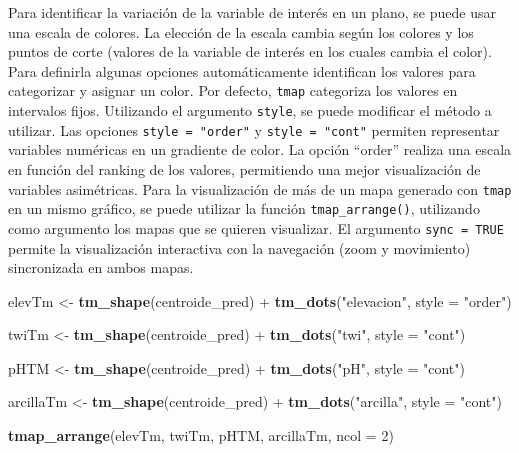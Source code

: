 \documentclass[11pt,b5paper,]{krantz}
\newenvironment{Shaded}{}{}
\newcommand{\KeywordTok}[1]{\textcolor[rgb]{0.00,0.44,0.13}{\textbf{#1}}}
\newcommand{\DataTypeTok}[1]{\textcolor[rgb]{0.56,0.13,0.00}{#1}}
\newcommand{\DecValTok}[1]{\textcolor[rgb]{0.25,0.63,0.44}{#1}}
\newcommand{\StringTok}[1]{\textcolor[rgb]{0.25,0.44,0.63}{#1}}
\newcommand{\OperatorTok}[1]{\textcolor[rgb]{0.40,0.40,0.40}{#1}}
\newcommand{\NormalTok}[1]{#1}
\begin{document}
Para identificar la variación de la variable de interés en un plano, se
puede usar una escala de colores. La elección de la escala cambia según
los colores y los puntos de corte (valores de la variable de interés en
los cuales cambia el color). Para definirla algunas opciones
automáticamente identifican los valores para categorizar y asignar un
color. Por defecto, \texttt{tmap} categoriza los valores en intervalos
fijos. Utilizando el argumento \texttt{style}, se puede modificar el
método a utilizar. Las opciones \texttt{style\ =\ "order"} y
\texttt{style\ =\ "cont"} permiten representar variables numéricas en un
gradiente de color. La opción ``order'' realiza una escala en función
del ranking de los valores, permitiendo una mejor visualización de
variables asimétricas. Para la visualización de más de un mapa generado
con \texttt{tmap} en un mismo gráfico, se puede utilizar la función
\texttt{tmap\_arrange()}, utilizando como argumento los mapas que se
quieren visualizar. El argumento \texttt{sync\ =\ TRUE} permite la
visualización interactiva con la navegación (zoom y movimiento)
sincronizada en ambos mapas.

\begin{Shaded}
\begin{Highlighting}[]
\NormalTok{elevTm <-}\StringTok{ }\KeywordTok{tm_shape}\NormalTok{(centroide_pred) }\OperatorTok{+}
\StringTok{  }\KeywordTok{tm_dots}\NormalTok{(}\StringTok{"elevacion"}\NormalTok{, }\DataTypeTok{style =} \StringTok{"order"}\NormalTok{)}

\NormalTok{twiTm <-}\StringTok{ }\KeywordTok{tm_shape}\NormalTok{(centroide_pred) }\OperatorTok{+}
\StringTok{  }\KeywordTok{tm_dots}\NormalTok{(}\StringTok{"twi"}\NormalTok{, }\DataTypeTok{style =} \StringTok{"cont"}\NormalTok{)}

\NormalTok{pHTM <-}\StringTok{ }\KeywordTok{tm_shape}\NormalTok{(centroide_pred) }\OperatorTok{+}
\StringTok{  }\KeywordTok{tm_dots}\NormalTok{(}\StringTok{"pH"}\NormalTok{, }\DataTypeTok{style =} \StringTok{"cont"}\NormalTok{)}

\NormalTok{arcillaTm <-}\StringTok{ }\KeywordTok{tm_shape}\NormalTok{(centroide_pred) }\OperatorTok{+}
\StringTok{  }\KeywordTok{tm_dots}\NormalTok{(}\StringTok{"arcilla"}\NormalTok{, }\DataTypeTok{style =} \StringTok{"cont"}\NormalTok{)}

\KeywordTok{tmap_arrange}\NormalTok{(elevTm, twiTm, pHTM, arcillaTm, }
             \DataTypeTok{ncol =} \DecValTok{2}\NormalTok{)}
\end{Highlighting}
\end{Shaded}
\end{document}
